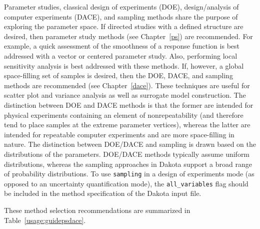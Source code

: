 Parameter studies, classical design of experiments (DOE),
design/analysis of computer experiments (DACE), and sampling methods
share the purpose of exploring the parameter space.  If directed
studies with a defined structure are desired, then parameter study
methods (see Chapter~\ref{ps}) are recommended. For example, a quick
assessment of the smoothness of a response function is best addressed
with a vector or centered parameter study. Also, performing local
sensitivity analysis is best addressed with these methods. If,
however, a global space-filling set of samples is desired, then the
DOE, DACE, and sampling methods are recommended (see
Chapter~\ref{dace}).  These techniques are useful for scatter plot and
variance analysis as well as surrogate model construction. The
distinction between DOE and DACE methods is that the former are
intended for physical experiments containing an element of
nonrepeatability (and therefore tend to place samples at the extreme
parameter vertices), whereas the latter are intended for repeatable
computer experiments and are more space-filling in nature. The
distinction between DOE/DACE and sampling is drawn based on the
distributions of the parameters.  DOE/DACE methods typically assume
uniform distributions, whereas the sampling approaches in Dakota
support a broad range of probability distributions. To use
\texttt{sampling} in a design of experiments mode (as opposed to
an uncertainty quantification mode), the \texttt{all\_variables} flag
should be included in the method specification of the Dakota input
file.

These method selection recommendations are summarized in
Table~\ref{usage:guidepsdace}.

